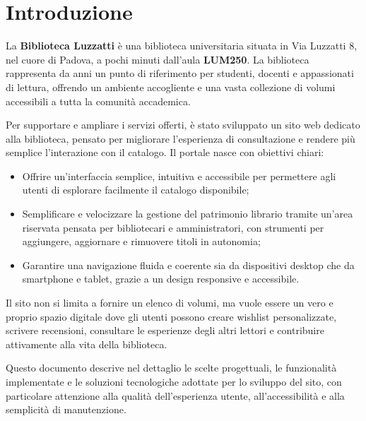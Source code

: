 \documentclass{article}
\begin{document}
\newpage

\tableofcontents        %

\newpage

\section{Introduzione}
La \textbf{Biblioteca Luzzatti} è una biblioteca universitaria situata in Via Luzzatti 8, nel cuore di Padova, a pochi minuti dall'aula \textbf{LUM250}. La biblioteca rappresenta da anni un punto di riferimento per studenti, docenti e appassionati di lettura, offrendo un ambiente accogliente e una vasta collezione di volumi accessibili a tutta la comunità accademica.

Per supportare e ampliare i servizi offerti, è stato sviluppato un sito web dedicato alla biblioteca, pensato per migliorare l'esperienza di consultazione e rendere più semplice l'interazione con il catalogo. Il portale nasce con obiettivi chiari:

\begin{itemize}
    \item Offrire un'interfaccia semplice, intuitiva e accessibile per permettere agli utenti di esplorare facilmente il catalogo disponibile;
    \item Semplificare e velocizzare la gestione del patrimonio librario tramite un'area riservata pensata per bibliotecari e amministratori, con strumenti per aggiungere, aggiornare e rimuovere titoli in autonomia;
    \item Garantire una navigazione fluida e coerente sia da dispositivi desktop che da smartphone e tablet, grazie a un design responsive e accessibile.
\end{itemize}

Il sito non si limita a fornire un elenco di volumi, ma vuole essere un vero e proprio spazio digitale dove gli utenti possono creare wishlist personalizzate, scrivere recensioni, consultare le esperienze degli altri lettori e contribuire attivamente alla vita della biblioteca.

Questo documento descrive nel dettaglio le scelte progettuali, le funzionalità implementate e le soluzioni tecnologiche adottate per lo sviluppo del sito, con particolare attenzione alla qualità dell'esperienza utente, all'accessibilità e alla semplicità di manutenzione.


\newpage
\end{document}
